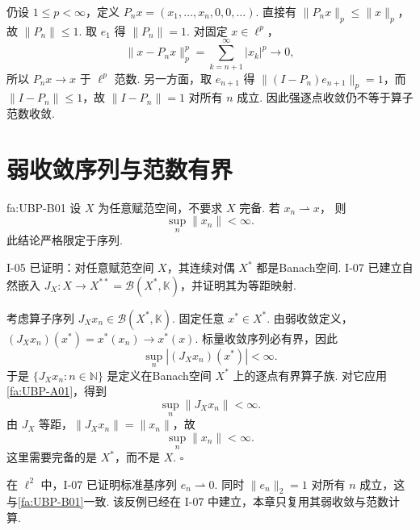 \begin{FAExample}[部分坐标投影]\label{i08:ellp-projection}
仍设 \(\displaystyle 1\leqslant p<\infty\)，定义
\(\displaystyle P_nx=(x_1,\dots,x_n,0,0,\dots)\).
直接有 \(\displaystyle \|P_nx\|_p\leqslant\|x\|_p\)，故 \(\displaystyle \|P_n\|\leqslant1\). 取 \(\displaystyle e_1\) 得 \(\displaystyle \|P_n\|=1\). 对固定 \(\displaystyle x\in\ell^p\)，
\[
\|x-P_nx\|_p^p=\sum_{k=n+1}^{\infty}|x_k|^p\longrightarrow0,
\]
所以 \(\displaystyle P_nx\to x\) 于 \(\displaystyle \ell^p\) 范数. 另一方面，取 \(\displaystyle e_{n+1}\) 得 \(\displaystyle \|(I-P_n)e_{n+1}\|_p=1\)，而 \(\displaystyle \|I-P_n\|\leqslant1\)，故 \(\displaystyle \|I-P_n\|=1\) 对所有 \(\displaystyle n\) 成立. 因此强逐点收敛仍不等于算子范数收敛.
\end{FAExample}

\section{弱收敛序列与范数有界}\label{sec:i08-weak-sequences}

\begin{FATheorem}[B][弱收敛序列蕴含范数有界]{fa:UBP-B01}
设 \(\displaystyle X\) 为任意赋范空间，不要求 \(\displaystyle X\) 完备. 若
\(\displaystyle x_n\rightharpoonup x\)，
则
\[
\sup_n\|x_n\|<\infty.
\]
此结论严格限定于序列.
\end{FATheorem}

\begin{FAProof}
I-05 已证明：对任意赋范空间 \(\displaystyle X\)，其连续对偶 \(\displaystyle X^*\) 都是Banach空间. I-07 已建立自然嵌入 \(\displaystyle J_X:X\to X^{**}=\mathcal B(X^*,\mathbb K)\)，并证明其为等距映射.

考虑算子序列 \(\displaystyle J_Xx_n\in\mathcal B(X^*,\mathbb K)\). 固定任意 \(\displaystyle x^*\in X^*\). 由弱收敛定义，
\(\displaystyle (J_Xx_n)(x^*)=x^*(x_n)\longrightarrow x^*(x)\).
标量收敛序列必有界，因此
\[
\sup_n|(J_Xx_n)(x^*)|<\infty.
\]
于是 \(\displaystyle \{J_Xx_n:n\in\mathbb N\}\) 是定义在Banach空间 \(\displaystyle X^*\) 上的逐点有界算子族. 对它应用\autoref{fa:UBP-A01}，得到
\[
\sup_n\|J_Xx_n\|<\infty.
\]
由 \(\displaystyle J_X\) 等距，\(\displaystyle \|J_Xx_n\|=\|x_n\|\)，故
\[
\sup_n\|x_n\|<\infty.
\]
这里需要完备的是 \(\displaystyle X^*\)，而不是 \(\displaystyle X\).
\hfill\(\square\)
\end{FAProof}

\begin{FAExample}
在 \(\displaystyle \ell^2\) 中，I-07 已证明标准基序列 \(\displaystyle e_n\rightharpoonup0\). 同时 \(\displaystyle \|e_n\|_2=1\) 对所有 \(\displaystyle n\) 成立，这与\autoref{fa:UBP-B01}一致. 该反例已经在 I-07 中建立，本章只复用其弱收敛与范数计算.
\end{FAExample}

